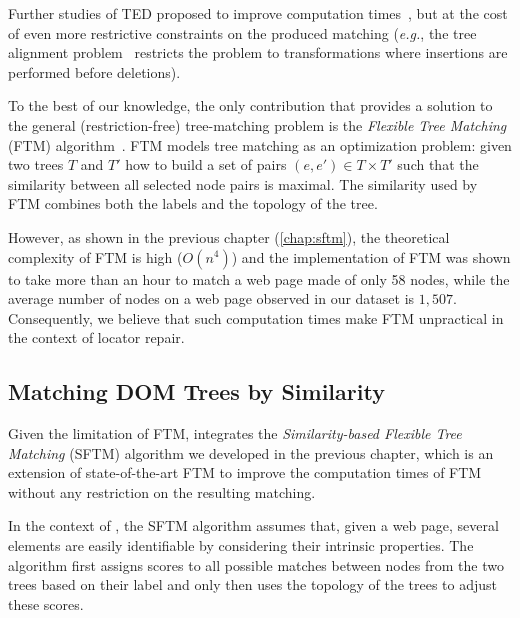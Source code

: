 Further studies of TED proposed to improve computation times~\cite{jiang1995alignment, valiente2001efficient, zhang1996constrained}, but at the cost of even more restrictive constraints on the produced matching (\emph{e.g.}, the tree alignment problem~\cite{jiang1995alignment} restricts the problem to transformations where insertions are performed before deletions).

To the best of our knowledge, the only contribution that provides a solution to the general (restriction-free) tree-matching problem is the \emph{Flexible Tree Matching} (FTM) algorithm~\cite{Kumar2011_FTM}.
FTM models tree matching as an optimization problem: given two trees $T$ and $T'$ how to build a set of pairs $(e,e') \in T \times T'$ such that the similarity between all selected node pairs is maximal.
The similarity used by FTM combines both the labels and the topology of the tree.

However, as shown in the previous chapter (\ref{chap:sftm}), the theoretical complexity of FTM is high ($O(n^4)$) and the implementation of FTM was shown to take more than an hour to match a web page made of only 58 nodes, while the average number of nodes on a web page observed in our dataset is $1,507$.
Consequently, we believe that such computation times make FTM unpractical in the context of locator repair.


\subsection{Matching DOM Trees by Similarity}\label{erratum:sec:SFTM}
Given the limitation of FTM, \erratum{} integrates the \emph{Similarity-based Flexible Tree Matching} (SFTM) algorithm we developed in the previous chapter, which is an extension of state-of-the-art FTM to improve the computation times of FTM without any restriction on the resulting matching. 

In the context of \erratum{}, the SFTM algorithm assumes that, given a web page, several elements are easily identifiable by considering their intrinsic properties.
The algorithm first assigns scores to all possible matches between nodes from the two trees based on their label and only then uses the topology of the trees to adjust these scores.

